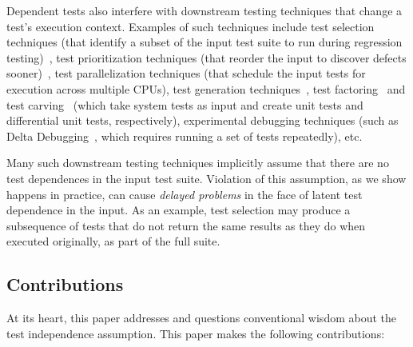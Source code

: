 Dependent tests also interfere with downstream testing
techniques that change a test's execution context.
Examples of such techniques include
test selection techniques (that identify a subset of
the input test suite to run during
regression testing)~\cite{harroldetal:OOPSLA:2001},
test prioritization techniques (that reorder the
input to discover defects sooner)~\cite{Elbaum:2000:PTC:347324.348910},
test parallelization techniques (that schedule the input tests for execution across multiple
CPUs), test generation techniques~\cite{PachecoLET2007, SPLAT},
test factoring~\cite{Saff:2005} and test carving~\cite{Elbaum:2006} (which take system tests as
input and create unit tests and differential unit tests,
respectively), experimental debugging techniques (such as Delta Debugging~\cite{Zeller:2002},
which requires running a set of tests repeatedly), etc. 

Many such downstream testing techniques implicitly assume that
there are no test dependences in the input test suite.  Violation of
this assumption, as we show happens in practice, can cause \emph{delayed problems} in the face
of latent test dependence in the input.  As an
example, test selection may produce a subsequence of tests that do not
return the same results as they do when executed originally, as part of the full suite.


\subsection{Contributions}

At its heart, this paper addresses and questions
conventional wisdom about the test independence assumption. 
This paper makes the following contributions:

